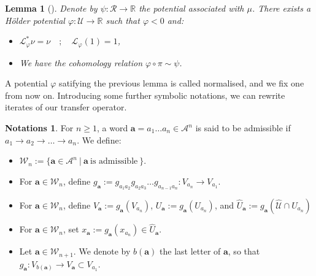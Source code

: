 \documentclass[a4paper]{article}
\newtheorem{lemma}[theorem]{Lemma}
\theoremstyle{definition}
\newtheorem{notations}[example]{Notations}
\begin{document}
\begin{lemma}[\cite{PP90,Cl20,Le23a}]
Denote by $\psi:\mathcal{R} \rightarrow \mathbb{R}$ the potential associated with $\mu$.
There exists a Hölder potential $\varphi:\mathcal{U} \rightarrow \mathbb{R}$ such that $\varphi < 0 $ and:
\begin{itemize}
\item $\mathcal{L}_\varphi^* \nu = \nu \quad ; \quad \mathcal{L}_\varphi(1) = 1$,
\item We have the cohomology relation $\varphi \circ \pi \sim \psi$.
\end{itemize}
\end{lemma}
A potential $\varphi$ satifying the previous lemma is called normalised, and we fix one from now on. Introducing some further symbolic notations, we can rewrite iterates of our transfer operator.

\begin{notations}
For $n \geq 1$, a word $\mathbf{a} = a_1 \dots a_n \in \mathcal{A}^n$ is said to be admissible if $a_1 \rightarrow a_2 \rightarrow \dots \rightarrow a_n$. We define:
\begin{itemize}
    \item $\mathcal{W}_n := \{ \mathbf{a} \in \mathcal{A}^n \ | \ \mathbf{a} \ \text{is admissible} \ \}$.
    \item For $\mathbf{a} \in \mathcal{W}_n$, define $g_{\mathbf{a}} := g_{a_1 a_2}  g_{a_2 a_3}  \dots g_{a_{n-1} a_{n}} : V_{a_n} \longrightarrow V_{a_{1}}$. 
    \item For $\mathbf{a} \in \mathcal{W}_n$, define $V_{\mathbf{a}} := g_{\mathbf{a}}\left( V_{a_n} \right)$, $ U_{\mathbf{a}} := g_{\mathbf{a}}\left( U_{a_n} \right) $, and $ \widehat{U}_{\mathbf{a}} := g_{\mathbf{a}}\left( \widehat{\mathcal{U}} \cap U_{a_n} \right) $ 
    \item For $\mathbf{a} \in \mathcal{W}_n$, set $x_{\mathbf{a}} := g_{\mathbf{a}}\left( x_{a_n} \right) \in \widehat{U}_{\mathbf{a}} $. 
    
    \item Let $\mathbf{a} \in \mathcal{W}_{n+1}$. We denote by $b(\mathbf{a})$ the last letter of $\mathbf{a}$, so that $g_\mathbf{a} : V_{b(\mathbf{a})} \rightarrow V_{\mathbf{a}} \subset V_{a_1}$.

\end{itemize}


\end{notations}
\end{document}
